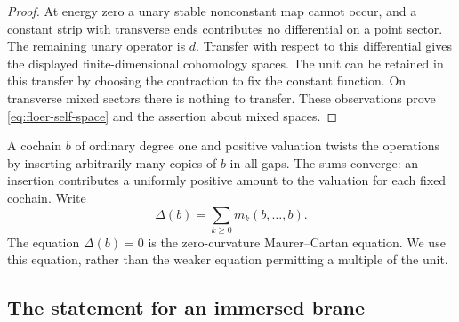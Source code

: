 \documentclass[11pt]{article}
\numberwithin{equation}{section}
\theoremstyle{definition}
\theoremstyle{remark}
\begin{document}
\begin{proof}
At energy zero a unary stable nonconstant map cannot occur, and a
constant strip with transverse ends contributes no differential on a
point sector.  The remaining unary operator is $d$.  Transfer with
respect to this differential gives the displayed finite-dimensional
cohomology spaces.  The unit can be retained in this transfer by choosing
the contraction to fix the constant function.  On transverse mixed
sectors there is nothing to transfer.  These observations prove
\eqref{eq:floer-self-space} and the assertion about mixed spaces.
\end{proof}

A cochain $b$ of ordinary degree one and positive valuation twists the
operations by inserting arbitrarily many copies of $b$ in all gaps.
The sums converge: an insertion contributes a uniformly positive amount
to the valuation for each fixed cochain.  Write
\[
 \Delta(b)=\sum_{k\geq0}m_k(b,\ldots,b).
\]
The equation $\Delta(b)=0$ is the zero-curvature Maurer--Cartan equation.
We use this equation, rather than the weaker equation permitting a
multiple of the unit.

\subsection{The statement for an immersed brane}
\end{document}
